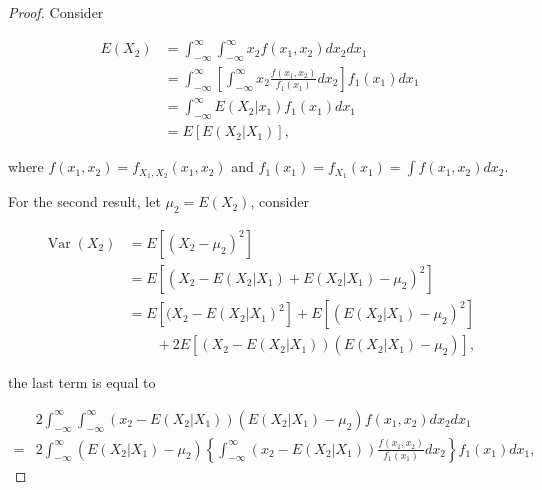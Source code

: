 \documentclass{article}
\begin{document}
                    \begin{proof}

                        Consider

                        \begin{align*}
                            E(X_{2}) &= \int_{-\infty}^{\infty} \int_{-\infty}^{\infty} x_{2} f(x_{1}, x_{2}) d x_{2} d x_{1} \\
                                     &= \int_{-\infty}^{\infty} \left[
                                         \int_{-\infty}^{\infty} x_{2} \frac{f(x_{1}, x_{2})}{f_{1}(x_{1})} d x_{2} \right] f_{1}(x_{1}) d x_{1} \\
                                     &= \int_{-\infty}^{\infty} E(X_{2}|x_{1}) f_{1}(x_{1}) d x_{1} \\
                                     &= E[E(X_{2}|X_{1})],
                        \end{align*}

                        where $ f(x_{1}, x_{2}) = f_{X_{1},X_{2}}(x_{1}, x_{2}) $
                        and $ f_{1}(x_{1}) = f_{X_{1}}(x_{1}) = \int f(x_{1},
                        x_{2}) d x_{2} $.

                        For the second result, let $ \mu_{2} = E(X_{2}) $, consider

                        \begin{align*}
                            \operatorname{Var}(X_{2}) &= E[(X_{2} - \mu_{2})^{2}] \\
                                                      &= E \left[ (X_{2} - E(X_{2}|X_{1}) + E(X_{2}|X_{1}) - \mu_{2})^{2} \right] \\
                                                      &= E \left[ (X_{2} - E(X_{2}|X_{1})^2 \right] + E \left[ (E(X_{2}|X_{1}) - \mu_{2})^2 \right] \\
                                                      &\qquad + 2E \left[ (X_{2} - E(X_{2}|X_{1}))(E(X_{2}|X_{1}) - \mu_{2}) \right],
                        \end{align*}

                        the last term is equal to

                        \begin{align*}
                             &2\int_{-\infty}^{\infty} \int_{-\infty}^{\infty}
                                 (x_{2} - E(X_{2}|X_{1}))(E(X_{2}|X_{1}) - \mu_{2}) f(x_{1}, x_{2}) d x_{2} d x_{1} \\
                            =&2\int_{-\infty}^{\infty} (E(X_{2}|X_{1}) - \mu_{2}) \left\{ \int_{-\infty}^{\infty}
                                (x_{2} - E(X_{2}|X_{1})) \frac{f(x_{1}, x_{2})}{f_{1}(x_{1})} d x_{2} \right\} f_{1}(x_{1}) d x_{1},
                        \end{align*}


\end{proof}
\end{document}
